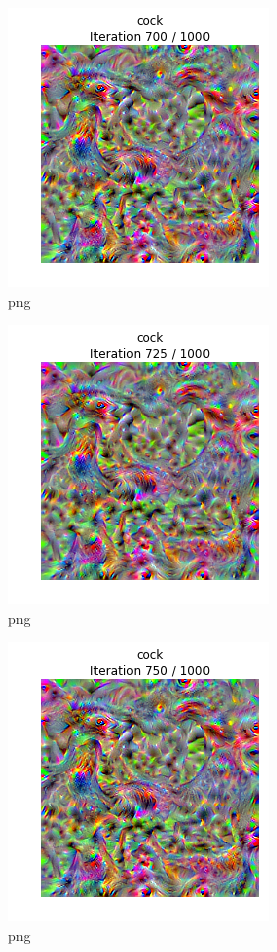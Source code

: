 \documentclass[]{book}
\theoremstyle{definition}
\theoremstyle{definition}
\theoremstyle{definition}
\theoremstyle{remark}
\begin{document}
\begin{figure}
\centering
\includegraphics{Network-Visualization-TensorFlow_files/Network-Visualization-TensorFlow_22_28.png}
\caption{png}
\end{figure}

\begin{figure}
\centering
\includegraphics{Network-Visualization-TensorFlow_files/Network-Visualization-TensorFlow_22_29.png}
\caption{png}
\end{figure}

\begin{figure}
\centering
\includegraphics{Network-Visualization-TensorFlow_files/Network-Visualization-TensorFlow_22_30.png}
\caption{png}
\end{figure}
\end{document}
